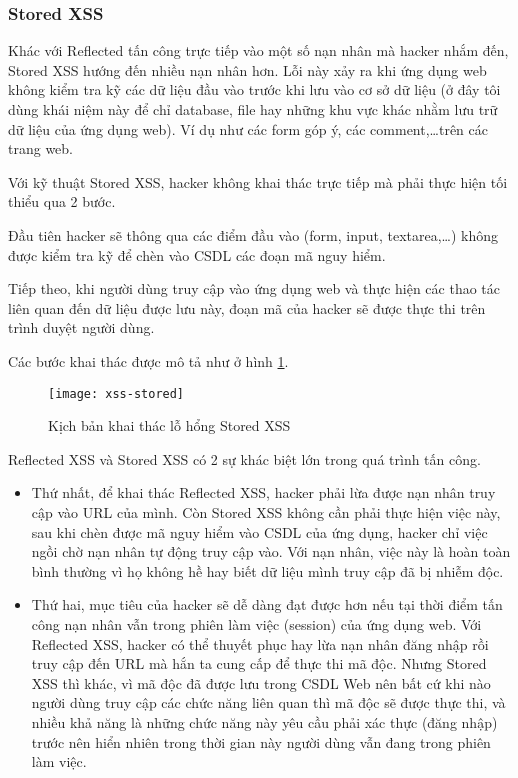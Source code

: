 \documentclass[../main-report.tex]{subfiles}
\begin{document}
\subsubsection*{Stored XSS}
Khác với Reflected tấn công trực tiếp vào một số nạn nhân mà hacker nhắm đến, Stored XSS hướng đến nhiều nạn nhân hơn. Lỗi này xảy ra khi ứng dụng web không kiểm tra kỹ các dữ liệu đầu vào trước khi lưu vào cơ sở dữ liệu (ở đây tôi dùng khái niệm này để chỉ database, file hay những khu vực khác nhằm lưu trữ dữ liệu của ứng dụng web). Ví dụ như các form góp ý, các comment,\ldots trên các trang web.

Với kỹ thuật Stored XSS, hacker không khai thác trực tiếp mà phải thực hiện tối thiểu qua 2 bước.

Đầu tiên hacker sẽ thông qua các điểm đầu vào (form, input, textarea,\ldots) không được kiểm tra kỹ để chèn vào CSDL các đoạn mã nguy hiểm.

Tiếp theo, khi người dùng truy cập vào ứng dụng web và thực hiện các thao tác liên quan đến dữ liệu được lưu này, đoạn mã của hacker sẽ được thực thi trên trình duyệt người dùng.

Các bước khai thác được mô tả như ở hình \ref{fig:xss_stored}.

\begin{figure}[ht!]
\centering\texttt{[image: xss-stored]}
\caption{Kịch bản khai thác lỗ hổng Stored XSS}
\label{fig:xss_stored}
\end{figure}

Reflected XSS và Stored XSS có 2 sự khác biệt lớn trong quá trình tấn công.

\begin{itemize}
\item Thứ nhất, để khai thác Reflected XSS, hacker phải lừa được nạn nhân truy cập vào URL của mình. Còn Stored XSS không cần phải thực hiện việc này, sau khi chèn được mã nguy hiểm vào CSDL của ứng dụng, hacker chỉ việc ngồi chờ nạn nhân tự động truy cập vào. Với nạn nhân, việc này là hoàn toàn bình thường vì họ không hề hay biết dữ liệu mình truy cập đã bị nhiễm độc.
\item Thứ hai, mục tiêu của hacker sẽ dễ dàng đạt được hơn nếu tại thời điểm tấn công nạn nhân vẫn trong phiên làm việc (session) của ứng dụng web. Với Reflected XSS, hacker có thể thuyết phục hay lừa nạn nhân đăng nhập rồi truy cập đến URL mà hắn ta cung cấp để thực thi mã độc. Nhưng Stored XSS thì khác, vì mã độc đã được lưu trong CSDL Web nên bất cứ khi nào người dùng truy cập các chức năng liên quan thì mã độc sẽ được thực thi, và nhiều khả năng là những chức năng này yêu cầu phải xác thực (đăng nhập) trước nên hiển nhiên trong thời gian này người dùng vẫn đang trong phiên làm việc.
\end{itemize}
\end{document}
